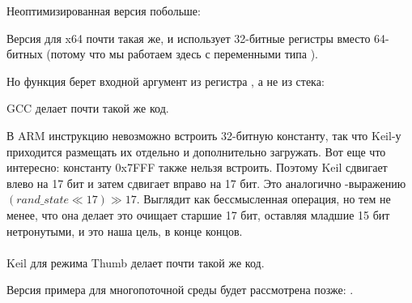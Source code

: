 Неоптимизированная версия побольше:




Версия для x64 почти такая же, и использует 32-битные регистры вместо 64-битных
(потому что мы работаем здесь с переменными типа \Tint).

Но функция  берет входной аргумент из регистра \ECX, а не из стека:



GCC делает почти такой же код.




В ARM инструкцию невозможно встроить 32-битную константу, так что Keil-у приходится размещать их отдельно и дополнительно загружать.
Вот еще что интересно: константу 0x7FFF также нельзя встроить.
Поэтому Keil сдвигает  влево на 17 бит и затем сдвигает вправо на 17 бит.
Это аналогично \CCpp{}-выражению $(rand\_state \ll 17) \gg 17$.
Выглядит как бессмысленная операция, но тем не менее, что она делает это очищает старшие 17 бит, оставляя младшие 15 бит нетронутыми, и это наша цель, в конце концов. \\
\\
\Optimizing Keil для режима Thumb делает почти такой же код.




Версия примера для многопоточной среды будет рассмотрена позже: .

